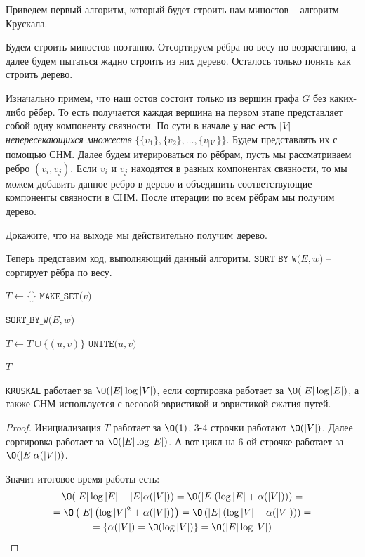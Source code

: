 Приведем первый алгоритм, который будет строить нам миностов -- алгоритм Крускала.

Будем строить миностов поэтапно. Отсортируем рёбра по весу по возрастанию, а далее будем пытаться жадно строить из них дерево.
Осталось только понять как строить дерево.

Изначально примем, что наш остов состоит только из вершин графа $G$ без каких-либо рёбер.
То есть получается каждая вершина на первом этапе представляет собой одну компоненту связности.
По сути в начале у нас есть $|V|$ \textit{непересекающихся множеств} $\{\{v_1\}, \{v_2\}, \dots, \{v_{|V|}\} \}$. Будем представлять их с помощью СНМ.
Далее будем итерироваться по рёбрам, пусть мы рассматриваем ребро $(v_i, v_j)$. 
Если $v_i$ и $v_j$ находятся в разных компонентах связности, то мы можем добавить данное ребро в дерево и объединить соответствующие компоненты связности в СНМ.
После итерации по всем рёбрам мы получим дерево.

\Exe Докажите, что на выходе мы действительно получим дерево.

Теперь представим код, выполняющий данный алгоритм. $\texttt{SORT\_BY\_W(}E, w\texttt{)}$ -- сортирует рёбра по весу.

\begin{algorithm}[H]
\caption{Алгоритм Крускала}
\begin{algorithmic}[1]

    \State $T \gets \{\}$
        \State $\texttt{MAKE\_SET(}v\texttt{)}$
    \EndFor

    \State $\texttt{SORT\_BY\_W(}E, w\texttt{)}$
    
            \State $T \gets T \cup \{(u, v)\}$
            \State $\texttt{UNITE(}u, v\texttt{)}$
        \EndIf
    \EndFor

    \State \Return $T$
\EndFunction
\end{algorithmic}
\end{algorithm}

\St \texttt{KRUSKAL} работает за $\O(|E| \log |V|)$, если сортировка работает за $\O(|E| \log |E|)$, а также СНМ используется с весовой эвристикой и эвристикой сжатия путей.
\begin{proof}
    
    Инициализация $T$ работает за $\O(1)$, 3-4 строчки работают $\O(|V|)$. 
    Далее сортировка работает за $\O(|E| \log |E|)$. А вот цикл на 6-ой строчке работает за $\O(|E| \alpha(|V|))$.

    Значит итоговое время работы есть:
    \begin{multline*}
        \O(|E| \log |E| + |E| \alpha(|V|)) = \O(|E| (\log |E| + \alpha(|V|))) = \\ 
        = \O\left(|E| \left(\log |V|^2 + \alpha(|V|)\right)\right) = \O\left(|E| \left(\log |V| + \alpha(|V|)\right)\right) = \\
        = \left\{ \alpha(|V|) = \O(\log |V|) \right\} = \O(|E| \log |V|)
    \end{multline*}

\end{proof}

